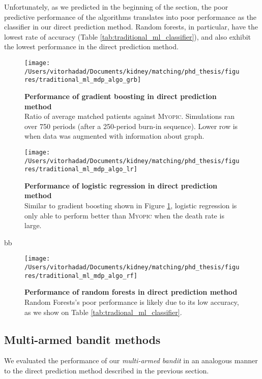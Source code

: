 \begin{itemize}
Unfortunately, as we predicted in the beginning of the section, the poor predictive performance of the algorithms translates into poor performance as the classifier in our direct prediction method. Random forests, in particular, have the lowest rate of accuracy (Table \ref{tab:traditional_ml_classifier}), and also exhibit the lowest performance in the direct prediction method.


\begin{figure}
\centering
\texttt{[image: /Users/vitorhadad/Documents/kidney/matching/phd\_thesis/figures/traditional\_ml\_mdp\_algo\_grb]}
\caption{\textbf{Performance of gradient boosting in direct prediction method} \\
    Ratio of average matched patients against \textsc{Myopic}. Simulations ran over 750 periods (after a 250-period burn-in sequence). Lower row is when data was augmented with information about graph.}
\label{fig:traditional_ml_mdp_algo_grb}
\end{figure}

\begin{figure}
\centering
\texttt{[image: /Users/vitorhadad/Documents/kidney/matching/phd\_thesis/figures/traditional\_ml\_mdp\_algo\_lr]}
\caption{\textbf{Performance of logistic regression in direct prediction method} \\
    Similar to gradient boosting shown in Figure \ref{fig:traditional_ml_mdp_algo_grb}, logistic regression is only able to perform better than \textsc{Myopic} when the death rate is large.}
\label{fig:traditional_ml_mdp_algo_lr}
\end{figure}
bb
\begin{figure}
\centering
\texttt{[image: /Users/vitorhadad/Documents/kidney/matching/phd\_thesis/figures/traditional\_ml\_mdp\_algo\_rf]}
\caption{\textbf{Performance of random forests in direct prediction method} \\
    Random Forests's poor performance is likely due to its low accuracy, as we show on Table \ref{tab:tradional_ml_classifier}.}
\label{fig:traditional_ml_mdp_algo_rf}
\end{figure}

\subsection{Multi-armed bandit methods}

We evaluated the performance of our \emph{multi-armed bandit} in an analogous manner to the direct prediction method described in the previous section.


\end{itemize}

